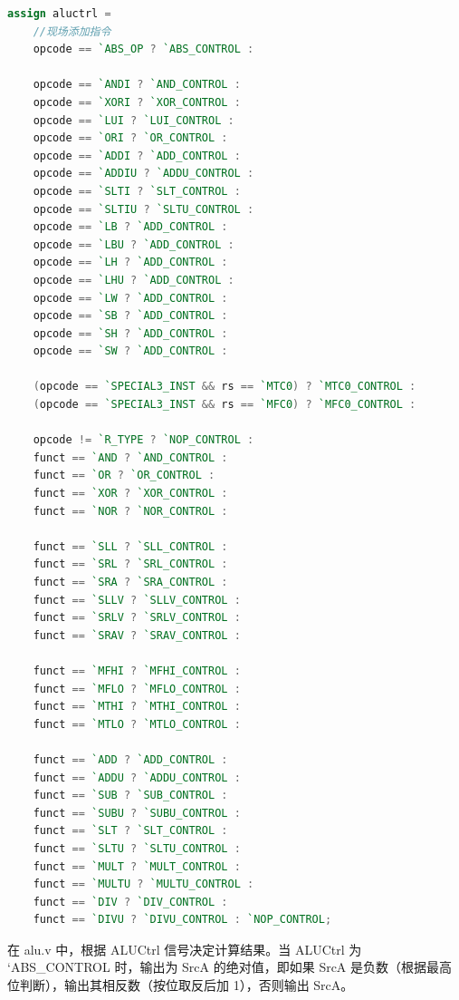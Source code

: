 \begin{lstlisting}[language=Verilog]
assign aluctrl = 
    //现场添加指令
    opcode == `ABS_OP ? `ABS_CONTROL :

    opcode == `ANDI ? `AND_CONTROL :
    opcode == `XORI ? `XOR_CONTROL :
    opcode == `LUI ? `LUI_CONTROL :
    opcode == `ORI ? `OR_CONTROL :
    opcode == `ADDI ? `ADD_CONTROL :
    opcode == `ADDIU ? `ADDU_CONTROL :
    opcode == `SLTI ? `SLT_CONTROL :
    opcode == `SLTIU ? `SLTU_CONTROL :
    opcode == `LB ? `ADD_CONTROL :
    opcode == `LBU ? `ADD_CONTROL :
    opcode == `LH ? `ADD_CONTROL :
    opcode == `LHU ? `ADD_CONTROL :
    opcode == `LW ? `ADD_CONTROL :
    opcode == `SB ? `ADD_CONTROL :
    opcode == `SH ? `ADD_CONTROL :
    opcode == `SW ? `ADD_CONTROL :

    (opcode == `SPECIAL3_INST && rs == `MTC0) ? `MTC0_CONTROL :
    (opcode == `SPECIAL3_INST && rs == `MFC0) ? `MFC0_CONTROL :

    opcode != `R_TYPE ? `NOP_CONTROL :
    funct == `AND ? `AND_CONTROL :
    funct == `OR ? `OR_CONTROL :
    funct == `XOR ? `XOR_CONTROL :
    funct == `NOR ? `NOR_CONTROL :

    funct == `SLL ? `SLL_CONTROL :
    funct == `SRL ? `SRL_CONTROL :
    funct == `SRA ? `SRA_CONTROL :
    funct == `SLLV ? `SLLV_CONTROL :
    funct == `SRLV ? `SRLV_CONTROL :
    funct == `SRAV ? `SRAV_CONTROL :

    funct == `MFHI ? `MFHI_CONTROL :
    funct == `MFLO ? `MFLO_CONTROL :
    funct == `MTHI ? `MTHI_CONTROL :
    funct == `MTLO ? `MTLO_CONTROL :

    funct == `ADD ? `ADD_CONTROL :
    funct == `ADDU ? `ADDU_CONTROL :
    funct == `SUB ? `SUB_CONTROL :
    funct == `SUBU ? `SUBU_CONTROL :
    funct == `SLT ? `SLT_CONTROL :
    funct == `SLTU ? `SLTU_CONTROL :
    funct == `MULT ? `MULT_CONTROL :
    funct == `MULTU ? `MULTU_CONTROL :
    funct == `DIV ? `DIV_CONTROL :
    funct == `DIVU ? `DIVU_CONTROL : `NOP_CONTROL;
\end{lstlisting}

在 alu.v 中，根据 ALUCtrl 信号决定计算结果。当 ALUCtrl 为 `ABS\_CONTROL 时，输出为 SrcA 的绝对值，即如果 SrcA 是负数（根据最高位判断），输出其相反数（按位取反后加 1），否则输出 SrcA。

